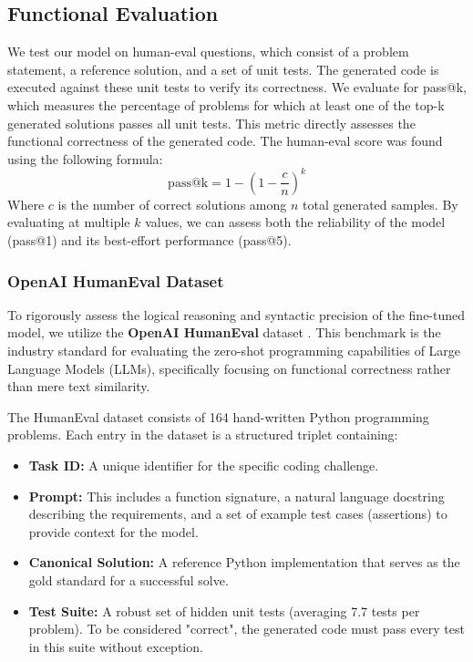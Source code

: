 \subsection{Functional Evaluation}
We test our model on human-eval questions, which consist of a problem statement, a reference solution, and a set of unit tests. The generated code is executed against these unit tests to verify its correctness.
We evaluate for pass@k, which measures the percentage of problems for which at least one of the top-k generated solutions passes all unit tests. This metric directly assesses the functional correctness of the generated code.
The human-eval score was found using the following formula:
\begin{equation}
\text{pass@k} = 1 - \left(1 - \frac{c}{n}\right)^k
\end{equation}
Where $c$ is the number of correct solutions among $n$ total generated samples. By evaluating at multiple $k$ values, we can assess both the reliability of the model (pass@1) and its best-effort performance (pass@5).

\subsubsection{OpenAI HumanEval Dataset}
To rigorously assess the logical reasoning and syntactic precision of the fine-tuned model, we utilize the \textbf{OpenAI HumanEval} dataset \cite{OpenAIHumanEval2021}. This benchmark is the industry standard for evaluating the zero-shot programming capabilities of Large Language Models (LLMs), specifically focusing on functional correctness rather than mere text similarity.

The HumanEval dataset consists of 164 hand-written Python programming problems. Each entry in the dataset is a structured triplet containing:
\begin{itemize}
    \item \textbf{Task ID:} A unique identifier for the specific coding challenge.
    \item \textbf{Prompt:} This includes a function signature, a natural language docstring describing the requirements, and a set of example test cases (assertions) to provide context for the model.
    \item \textbf{Canonical Solution:} A reference Python implementation that serves as the gold standard for a successful solve.
    \item \textbf{Test Suite:} A robust set of hidden unit tests (averaging 7.7 tests per problem). To be considered "correct", the generated code must pass every test in this suite without exception.
\end{itemize}

